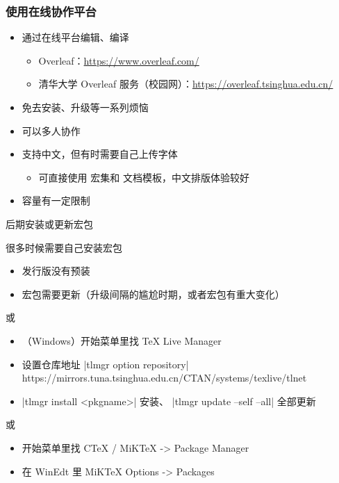 \begin{frame}[fragile]
  \frametitle{使用在线协作平台}
  \begin{itemize}
    \item 通过在线平台编辑、编译
      \begin{itemize}
        \item Overleaf：\url{https://www.overleaf.com/}
        \item 清华大学 Overleaf 服务（校园网）：\url{https://overleaf.tsinghua.edu.cn/}
      \end{itemize}
    \item 免去安装、升级等一系列烦恼
    \item 可以多人协作
    \item 支持中文，但有时需要自己上传字体
      \begin{itemize}
        \item 可直接使用  宏集和  文档模板，中文排版体验较好
      \end{itemize}
    \item 容量有一定限制
  \end{itemize}
\end{frame}


\begin{frame}[fragile]{后期安装或更新宏包}
  \begin{exampleblock}{很多时候需要自己安装宏包}
    \begin{itemize}
      \item 发行版没有预装
      \item 宏包需要更新（\TL 升级间隔的尴尬时期，或者宏包有重大变化）
    \end{itemize}
  \end{exampleblock}
  \begin{exampleblock}{\TL 或 \MacTeX}
    \begin{itemize}
      \item （Windows）开始菜单里找 TeX Live Manager
      \item 设置仓库地址 |tlmgr option repository| {\footnotesize\ttfamily
        https://mirrors.tuna.tsinghua.edu.cn/CTAN/systems/texlive/tlnet}
      \item |tlmgr install <pkgname>| 安装、 |tlmgr update --self --all| 全部更新
    \end{itemize}
  \end{exampleblock}
  \begin{exampleblock}{\CTeX 或 \MiKTeX}
    \begin{itemize}
      \item 开始菜单里找 CTeX / MiKTeX -> Package Manager
      \item 在 WinEdt 里 MiKTeX Options -> Packages
    \end{itemize}
  \end{exampleblock}
\end{frame}

